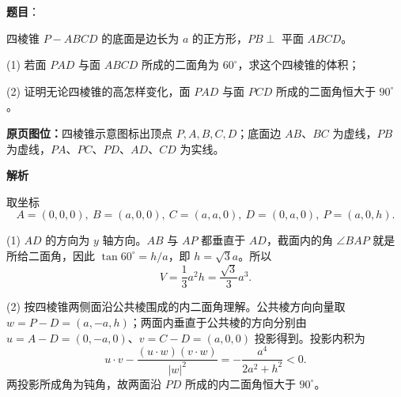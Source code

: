\begin{answer}

\textbf{题目}：

四棱锥 $P-ABCD$ 的底面是边长为 $a$ 的正方形，$PB\perp$ 平面 $ABCD$。

(1) 若面 $PAD$ 与面 $ABCD$ 所成的二面角为 $60^\circ$，求这个四棱锥的体积；

(2) 证明无论四棱锥的高怎样变化，面 $PAD$ 与面 $PCD$ 所成的二面角恒大于 $90^\circ$。

\textbf{原页图位：}四棱锥示意图标出顶点 $P,A,B,C,D$；底面边 $AB$、$BC$ 为虚线，$PB$ 为虚线，$PA$、$PC$、$PD$、$AD$、$CD$ 为实线。
\nopagebreak[4]
\begin{center}\end{center}
\nopagebreak[4]
\textbf{解析}

取坐标
\nopagebreak[4]
\[
A=(0,0,0),\ B=(a,0,0),\ C=(a,a,0),\ D=(0,a,0),\ P=(a,0,h).
\]


(1) $AD$ 的方向为 $y$ 轴方向。$AB$ 与 $AP$ 都垂直于 $AD$，截面内的角 $\angle BAP$ 就是所给二面角，因此 $\tan60^\circ=h/a$，即 $h=\sqrt3a$。所以
\nopagebreak[4]
\[
V=\frac13a^2h=\frac{\sqrt3}{3}a^3.
\]


(2) 按四棱锥两侧面沿公共棱围成的内二面角理解。公共棱方向向量取 $w=P-D=(a,-a,h)$；两面内垂直于公共棱的方向分别由 $u=A-D=(0,-a,0)$、$v=C-D=(a,0,0)$ 投影得到。投影内积为
\nopagebreak[4]
\[
u\cdot v-\frac{(u\cdot w)(v\cdot w)}{|w|^2}
=-\frac{a^4}{2a^2+h^2}<0.
\]
两投影所成角为钝角，故两面沿 $PD$ 所成的内二面角恒大于 $90^\circ$。



\end{answer}

